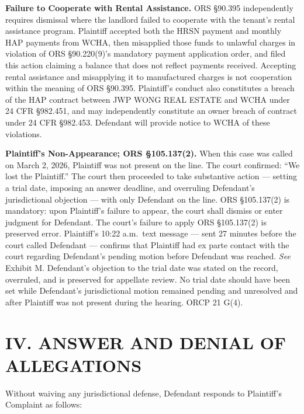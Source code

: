 \documentclass[12pt,letterpaper]{article}
\begin{document}
\textbf{Failure to Cooperate with Rental Assistance.} ORS \S90.395 independently requires dismissal where the landlord failed to cooperate with the tenant's rental assistance program. Plaintiff accepted both the HRSN payment and monthly HAP payments from WCHA, then misapplied those funds to unlawful charges in violation of ORS \S90.220(9)'s mandatory payment application order, and filed this action claiming a balance that does not reflect payments received. Accepting rental assistance and misapplying it to manufactured charges is not cooperation within the meaning of ORS \S90.395. Plaintiff's conduct also constitutes a breach of the HAP contract between JWP WONG REAL ESTATE and WCHA under 24 CFR \S982.451, and may independently constitute an owner breach of contract under 24 CFR \S982.453. Defendant will provide notice to WCHA of these violations.

\textbf{Plaintiff's Non-Appearance; ORS \S105.137(2).} When this case was called on March 2, 2026, Plaintiff was not present on the line. The court confirmed: ``We lost the Plaintiff.'' The court then proceeded to take substantive action --- setting a trial date, imposing an answer deadline, and overruling Defendant's jurisdictional objection --- with only Defendant on the line. ORS \S105.137(2) is mandatory: upon Plaintiff's failure to appear, the court shall dismiss or enter judgment for Defendant. The court's failure to apply ORS \S105.137(2) is preserved error. Plaintiff's 10:22 a.m.\ text message --- sent 27 minutes before the court called Defendant --- confirms that Plaintiff had ex parte contact with the court regarding Defendant's pending motion before Defendant was reached. \textit{See} Exhibit M. Defendant's objection to the trial date was stated on the record, overruled, and is preserved for appellate review. No trial date should have been set while Defendant's jurisdictional motion remained pending and unresolved and after Plaintiff was not present during the hearing. ORCP 21 G(4).

\section*{IV. ANSWER AND DENIAL OF ALLEGATIONS}

Without waiving any jurisdictional defense, Defendant responds to Plaintiff's Complaint as follows:
\end{document}
